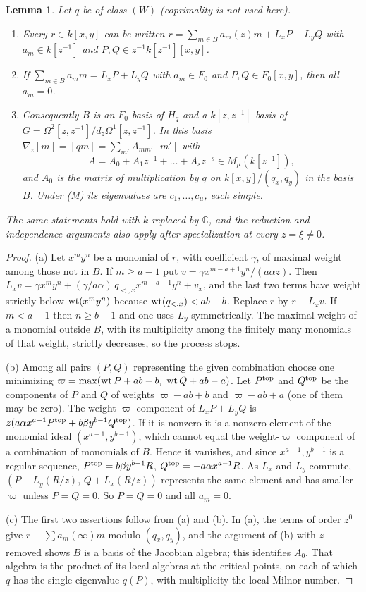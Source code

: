 \documentclass[11pt]{article}
\numberwithin{equation}{section}
\newtheorem{lemma}[theorem]{Lemma}
\theoremstyle{definition}
\theoremstyle{remark}
\newcommand{\C}{\mathbb C}\newcommand{\Q}{\mathbb Q}\newcommand{\R}{\mathbb R}\newcommand{\Z}{\mathbb Z}
\newcommand{\Hq}{H_q}
\begin{document}
\begin{lemma}\label{lem:normal}
Let $q$ be of class $(W)$ (coprimality is not used here).
\begin{enumerate}[label=\textup{(\alph*)},leftmargin=2.2em]
\item Every $r\in k[x,y]$ can be written
 $r=\sum_{m\in B}a_m(z)m+L_xP+L_yQ$ with $a_m\in k[z^{-1}]$ and
 $P,Q\in z^{-1}k[z^{-1}][x,y]$.
\item If $\sum_{m\in B}a_m m=L_xP+L_yQ$ with $a_m\in F_0$ and
 $P,Q\in F_0[x,y]$, then all $a_m=0$.
\item Consequently $B$ is an $F_0$-basis of $\Hq$ and a $k[z,z^{-1}]$-basis of
 $G=\Omega^2[z,z^{-1}]/d_z\Omega^1[z,z^{-1}]$. In this basis
 $\nabla_z[m]=[qm]=\sum_{m'}A_{mm'}[m']$ with
 \[
  A=A_0+A_1z^{-1}+\dots+A_sz^{-s}\in M_\mu(k[z^{-1}]),
 \]
 and $A_0$ is the matrix of multiplication by $q$ on
 $k[x,y]/(q_x,q_y)$ in the basis $B$. Under \textup{(M)} its eigenvalues are
 $c_1,\dots,c_\mu$, each simple.
\end{enumerate}
The same statements hold with $k$ replaced by $\C$, and the reduction and independence arguments also apply after specialization at every $z=\xi\ne0$.
\end{lemma}
\begin{proof}
(a) Let $x^my^n$ be a monomial of $r$, with coefficient $\gamma$, of maximal
weight among those not in $B$. If $m\ge a-1$ put $v=\gamma x^{m-a+1}y^n/(a\alpha z)$.
Then $L_xv=\gamma x^my^n+(\gamma/a\alpha)\,q_{<,x}x^{m-a+1}y^n+v_x$, and the last
two terms have weight strictly below $\operatorname{wt}(x^my^n)$ because
$\operatorname{wt}(q_{<,x})<ab-b$. Replace $r$ by $r-L_xv$. If $m<a-1$ then $n\ge b-1$ and one
uses $L_y$ symmetrically. The maximal weight of a monomial outside $B$, with its
multiplicity among the finitely many monomials of that weight, strictly
decreases, so the process stops.

(b) Among all pairs $(P,Q)$ representing the given combination choose one
minimizing $\varpi=\max(\operatorname{wt} P+ab-b,\ \operatorname{wt} Q+ab-a)$. Let $P^{\rm top}$ and $Q^{\rm top}$ be the components of $P$ and $Q$ of weights
$\varpi-ab+b$ and $\varpi-ab+a$ (one of them may be zero). The weight-$\varpi$
component of $L_xP+L_yQ$ is $z(a\alpha x^{a-1}P^{\rm top}+b\beta y^{b-1}Q^{\rm top})$. If it
is nonzero it is a nonzero element of the monomial ideal $(x^{a-1},y^{b-1})$,
which cannot equal the weight-$\varpi$ component of a combination of monomials
of $B$. Hence it vanishes, and since $x^{a-1},y^{b-1}$ is a regular sequence,
$P^{\rm top}=b\beta y^{b-1}R$, $Q^{\rm top}=-a\alpha x^{a-1}R$. As $L_x$ and $L_y$
commute, $(P-L_y(R/z),\,Q+L_x(R/z))$ represents the same element and has smaller
$\varpi$ unless $P=Q=0$. So $P=Q=0$ and all $a_m=0$.

(c) The first two assertions follow from (a) and (b). In (a), the terms of
order $z^0$ give $r\equiv\sum a_m(\infty)m$ modulo $(q_x,q_y)$, and the argument
of (b) with $z$ removed shows $B$ is a basis of the Jacobian algebra; this
identifies $A_0$. That algebra is the product of its local algebras at the
critical points, on each of which $q$ has the single eigenvalue $q(P)$, with
multiplicity the local Milnor number.
\end{proof}
\end{document}
